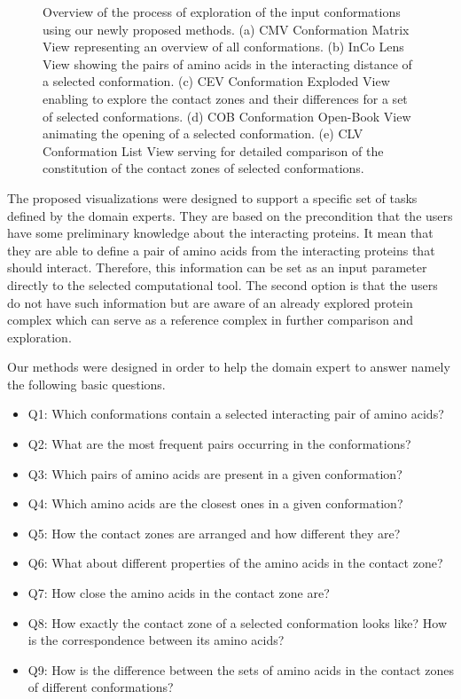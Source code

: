 \documentclass[journal]{vgtc}                %
\begin{document}
\begin{figure}[htb]
  \caption{Overview of the process of exploration of the input conformations using our newly proposed methods. (a) CMV Conformation Matrix View representing an overview of all conformations. (b) InCo Lens View showing the pairs of amino acids in the interacting distance of a selected conformation. (c) CEV Conformation Exploded View enabling to explore the contact zones and their differences for a set of selected conformations. (d) COB Conformation Open-Book View animating the opening of a selected conformation. (e) CLV Conformation List View serving for detailed comparison of the constitution of the contact zones of selected conformations.}
  \label{fig:workflow}
\end{figure}

The proposed visualizations were designed to support a specific set of tasks defined by the domain experts.
They are based on the precondition that the users have some preliminary knowledge about the interacting proteins.
It mean that they are able to define a pair of amino acids from the interacting proteins that should interact.
Therefore, this information can be set as an input parameter directly to the selected computational tool.
The second option is that the users do not have such information but are aware of an already explored protein complex which can serve as a reference complex in further comparison and exploration.

Our methods were designed in order to help the domain expert to answer namely the following basic questions.
\begin{itemize}
\item Q1: Which conformations contain a selected interacting pair of amino acids?
\item Q2: What are the most frequent pairs occurring in the conformations?
\item Q3: Which pairs of amino acids are present in a given conformation?
\item Q4: Which amino acids are the closest ones in a given conformation?
\item Q5: How the contact zones are arranged and how different they are?
\item Q6: What about different properties of the amino acids in the contact zone?
\item Q7: How close the amino acids in the contact zone are?
\item Q8: How exactly the contact zone of a selected conformation looks like? How is the correspondence between its amino acids?
\item Q9: How is the difference between the sets of amino acids in the contact zones of different conformations?
\end{itemize}
\end{document}
